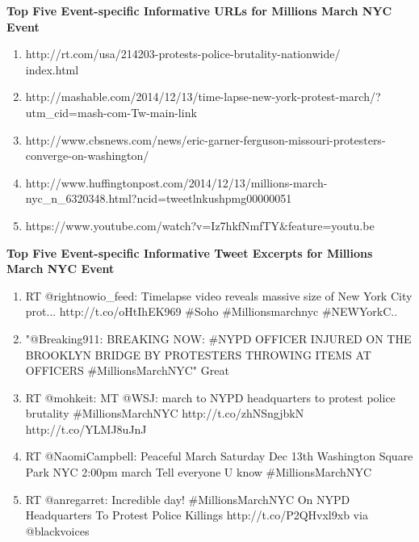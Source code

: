 \textbf{Top Five Event-specific Informative URLs for Millions March NYC Event}
\begin{enumerate}
\item http://rt.com/usa/214203-protests-police-brutality-nationwide/\\index.html
\item http://mashable.com/2014/12/13/time-lapse-new-york-protest-march/?utm\_cid=mash-com-Tw-main-link
\item http://www.cbsnews.com/news/eric-garner-ferguson-missouri-protesters-converge-on-washington/
\item http://www.huffingtonpost.com/2014/12/13/millions-march-nyc\_n\_6320348.html?ncid=tweetlnkushpmg00000051 
\item https://www.youtube.com/watch?v=Iz7hkfNmfTY\&feature=youtu.be                                                                                                                                                                                                                                                                                                                                                                                                                                                                                           
\end{enumerate}

\textbf{Top Five Event-specific Informative Tweet Excerpts for Millions March NYC Event}
\begin{enumerate}
\item RT @rightnowio\_feed: Timelapse video reveals massive size of New York City prot... http://t.co/oHtIhEK969 \#Soho \#Millionsmarchnyc \#NEWYorkC..
\item "@Breaking911: BREAKING NOW: \#NYPD OFFICER INJURED ON THE BROOKLYN BRIDGE BY PROTESTERS THROWING ITEMS AT OFFICERS \#MillionsMarchNYC" Great
\item RT @mohkeit: MT @WSJ: march to NYPD headquarters to protest police brutality \#MillionsMarchNYC http://t.co/zhNSngjbkN http://t.co/YLMJ8uJnJ
\item RT @NaomiCampbell: Peaceful March Saturday Dec 13th Washington Square Park NYC 2:00pm march   Tell everyone U know \#MillionsMarchNYC
\item RT @anregarret: Incredible day! \#MillionsMarchNYC On NYPD Headquarters To Protest Police Killings http://t.co/P2QHvxl9xb via @blackvoices \end{enumerate}

